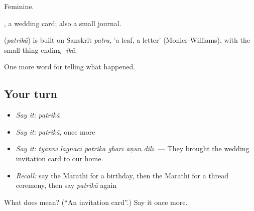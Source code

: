 Feminine.

, a wedding card; also a small journal.

\begin{cousinweb}
\textbf{} (\emph{patrikā}) is built on Sanskrit \emph{patra}, 'a leaf, a letter' (Monier-Williams), with the small-thing ending \emph{-ikā}.
\end{cousinweb}

\begin{grammarlens}[title={What you've built}]
One more word for telling what happened.
\end{grammarlens}

\subsection*{Your turn}
\begin{itemize}
\raggedright
  \item \emph{Say it:} \emph{patrikā}
  \item \emph{Say it:} \emph{patrikā}, once more
  \item \emph{Say it:} \emph{tyānnī lagnācī patrikā gharī āṇūn dilī.} — They brought the wedding invitation card to our home.
  \item \emph{Recall:} say the Marathi for a birthday, then the Marathi for a thread ceremony, then say \emph{patrikā} again
\end{itemize}

\begin{tcolorbox}[breakable,colback=teal!4,colframe=teal!35!black,title={Before you move on}]
What does  mean? (\textquotedblleft{}An invitation card\textquotedblright{}.) Say it once more.
\end{tcolorbox}
